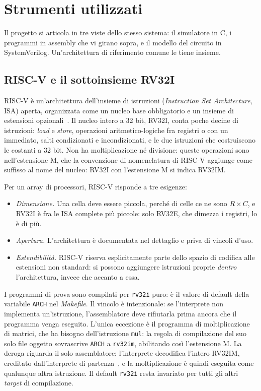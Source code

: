 \chapter{Strumenti utilizzati}
\label{ch:strumenti}

Il progetto si articola in tre viste dello stesso sistema: il simulatore
in C, i programmi in assembly che vi girano sopra, e il modello del
circuito in SystemVerilog. Un'architettura di riferimento comune le
tiene insieme.

\section{RISC-V e il sottoinsieme RV32I}
\label{sec:riscv}

RISC-V è un'architettura dell'insieme di istruzioni (\emph{Instruction
Set Architecture}, ISA) aperta, organizzata come un nucleo base
obbligatorio e un insieme di estensioni opzionali~\cite{RiscvSpec}. Il
nucleo intero a 32 bit, RV32I, conta poche decine di istruzioni: \emph{load} e \emph{store},
operazioni aritmetico-logiche fra registri o con un immediato, salti
condizionati e incondizionati, e le due istruzioni che costruiscono le
costanti a 32 bit. Non ha moltiplicazione né divisione: queste operazioni
sono nell'estensione M, che la convenzione di nomenclatura di RISC-V
aggiunge come suffisso al nome del nucleo: RV32I con l'estensione M si
indica RV32IM.

Per un array di processori, RISC-V risponde a tre esigenze:

\begin{itemize}
    \item \emph{Dimensione.} Una cella deve essere piccola, perché di
          celle ce ne sono $R \times C$, e RV32I è fra le ISA complete
          più piccole: solo RV32E, che dimezza i registri, lo è di più.
    \item \emph{Apertura.} L'architettura è documentata nel dettaglio
          e priva di vincoli d'uso.
    \item \emph{Estendibilità.} RISC-V riserva esplicitamente parte
          dello spazio di codifica alle estensioni non standard: si
          possono aggiungere istruzioni proprie \emph{dentro}
          l'architettura, invece che accanto a essa.
\end{itemize}
I programmi di prova sono compilati per \texttt{rv32i} puro: è il valore
di default della variabile \texttt{ARCH} nel \emph{Makefile}. Il vincolo
è intenzionale: se l'interprete non implementa un'istruzione,
l'assemblatore deve rifiutarla prima ancora che il programma venga
eseguito. L'unica eccezione è il programma di moltiplicazione di
matrici, che ha bisogno dell'istruzione \texttt{mul}: la regola di
compilazione del suo solo file oggetto sovrascrive \texttt{ARCH} a
\texttt{rv32im}, abilitando così l'estensione M. La deroga riguarda il
solo assemblatore: l'interprete decodifica l'intero RV32IM, ereditato
dall'interprete di partenza~\cite{TesiStella}, e la moltiplicazione è
quindi eseguita come qualunque altra istruzione. Il default
\texttt{rv32i} resta invariato per tutti gli altri \emph{target} di
compilazione.

